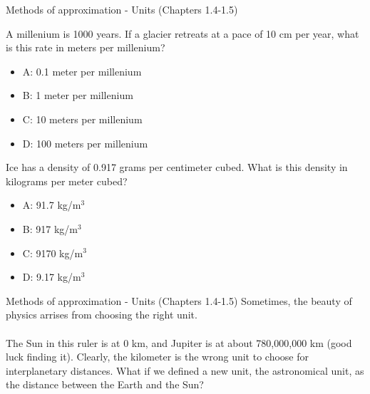 \documentclass{beamer}
\begin{document}
\begin{frame}{Methods of approximation - Units (Chapters 1.4-1.5)}
\small
\begin{minipage}[b]{0.45\linewidth}
A millenium is 1000 years.  If a glacier retreats at a pace of 10 cm per year, what is this rate in meters per millenium?
\vspace{0.2cm}
\begin{itemize}
\item A: 0.1 meter per millenium
\item B: 1 meter per millenium
\item C: 10 meters per millenium
\item D: 100 meters per millenium
\end{itemize}
\end{minipage}
\hspace{0.5cm}
\begin{minipage}[b]{0.45\linewidth}
Ice has a density of 0.917 grams per centimeter cubed.  What is this density in kilograms per meter cubed?
\vspace{1.1cm}
\begin{itemize}
\item A: 91.7 kg/m$^3$
\item B: 917 kg/m$^3$
\item C: 9170 kg/m$^3$
\item D: 9.17 kg/m$^3$
\end{itemize}
\end{minipage}
\end{frame}

\begin{frame}{Methods of approximation - Units (Chapters 1.4-1.5)}
\centering
Sometimes, the beauty of physics arrises from choosing the right unit. \\
\vspace{1cm}
\small
{} \\
\vspace{1cm}
\normalsize
The Sun in this ruler is at 0 km, and Jupiter is at about 780,000,000 km (good luck finding it).  Clearly, the kilometer is the wrong unit to choose for interplanetary distances.  What if we defined a new unit, the \alert{astronomical unit}, as the distance between the Earth and the Sun?
\end{frame}
\end{document}
